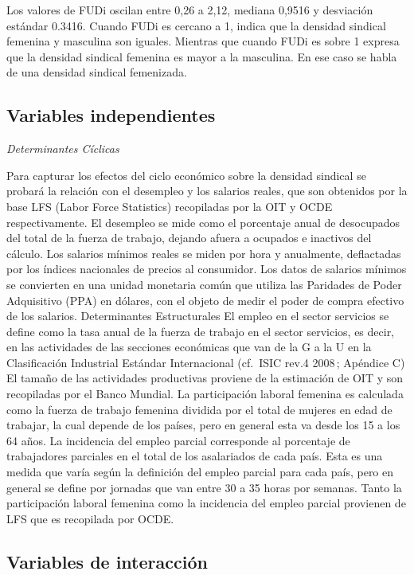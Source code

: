 \documentclass[
]{book}
\begin{document}
Los valores de FUDi oscilan entre 0,26 a 2,12, mediana 0,9516 y desviación estándar 0.3416. Cuando FUDi es cercano a 1, indica que la densidad sindical femenina y masculina son iguales. Mientras que cuando FUDi es sobre 1 expresa que la densidad sindical femenina es mayor a la masculina. En ese caso se habla de una densidad sindical femenizada.

\hypertarget{variables-independientes}{%
\subsection{Variables independientes}\label{variables-independientes}}

\emph{Determinantes Cíclicas}

Para capturar los efectos del ciclo económico sobre la densidad sindical se probará la relación con el desempleo y los salarios reales, que son obtenidos por la base LFS (Labor Force Statistics) recopiladas por la OIT y OCDE respectivamente.
El desempleo se mide como el porcentaje anual de desocupados del total de la fuerza de trabajo, dejando afuera a ocupados e inactivos del cálculo. Los salarios mínimos reales se miden por hora y anualmente, deflactadas por los índices nacionales de precios al consumidor. Los datos de salarios mínimos se convierten en una unidad monetaria común que utiliza las Paridades de Poder Adquisitivo (PPA) en dólares, con el objeto de medir el poder de compra efectivo de los salarios.
Determinantes Estructurales
El empleo en el sector servicios se define como la tasa anual de la fuerza de trabajo en el sector servicios, es decir, en las actividades de las secciones económicas que van de la G a la U en la Clasificación Industrial Estándar Internacional (cf.~ISIC rev.4 2008\,; Apéndice C) El tamaño de las actividades productivas proviene de la estimación de OIT y son recopiladas por el Banco Mundial.
La participación laboral femenina es calculada como la fuerza de trabajo femenina dividida por el total de mujeres en edad de trabajar, la cual depende de los países, pero en general esta va desde los 15 a los 64 años.
La incidencia del empleo parcial corresponde al porcentaje de trabajadores parciales en el total de los asalariados de cada país. Esta es una medida que varía según la definición del empleo parcial para cada país, pero en general se define por jornadas que van entre 30 a 35 horas por semanas. Tanto la participación laboral femenina como la incidencia del empleo parcial provienen de LFS que es recopilada por OCDE.

\hypertarget{variables-de-interacciuxf3n}{%
\subsection{Variables de interacción}\label{variables-de-interacciuxf3n}}
\end{document}
